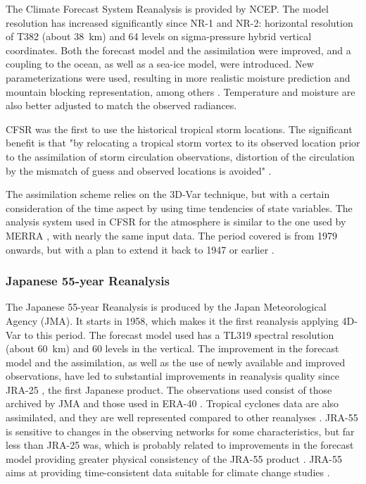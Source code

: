\documentclass{ametsoc}
\begin{document}
	The Climate Forecast System Reanalysis \citep[CFSR --][]{Saha2010a} is provided by NCEP. The model resolution has increased significantly since NR-1 and NR-2: horizontal resolution of T382 (about 38~km) and 64 levels on sigma-pressure hybrid vertical coordinates. Both the forecast model and the assimilation were improved, and a coupling to the ocean, as well as a sea-ice model, were introduced. New parameterizations were used, resulting in more realistic moisture prediction and mountain blocking representation, among others \citep{Saha2010a}. Temperature and moisture are also better adjusted to match the observed radiances.
	
	CFSR was the first to use the historical tropical storm locations. The significant benefit is that "by relocating a tropical storm vortex to its observed location prior to the assimilation of storm circulation observations, distortion of the circulation by the mismatch of guess and observed locations is avoided" \citep{Saha2010a}.
	
	The assimilation scheme relies on the 3D-Var technique, but with a certain consideration of the time aspect by using time tendencies of state variables. The analysis system used in CFSR for the atmosphere is similar to the one used by MERRA \citep{Rienecker2011}, with nearly the same input data. The period covered is from 1979 onwards, but with a plan to extend it back to 1947 or earlier \citep{Saha2010a}.
	
	
	\subsubsection{Japanese 55-year Reanalysis}
	
	The Japanese 55-year Reanalysis \citep[JRA-55 --][]{Kobayashi2015, Harada2016} is produced by the Japan Meteorological Agency (JMA). It starts in 1958, which makes it the first reanalysis applying 4D-Var to this period. The forecast model used has a TL319 spectral resolution (about 60~km) and 60 levels in the vertical. The improvement in the forecast model and the assimilation, as well as the use of newly available and improved observations, have led to substantial improvements in reanalysis quality since JRA-25 \citep{Onogi2007}, the first Japanese product. The observations used consist of those archived by JMA and those used in ERA-40 \citep{Uppala2005}. Tropical cyclones data are also assimilated, and they are well represented compared to other reanalyses \citep{Harada2016}. JRA-55 is sensitive to changes in the observing networks for some characteristics, but far less than JRA-25 was, which is probably related to improvements in the forecast model providing greater physical consistency of the JRA-55 product \citep{Kobayashi2015}. JRA-55 aims at providing time-consistent data suitable for climate change studies \citep{Ebita2011}.
	
\end{document}
